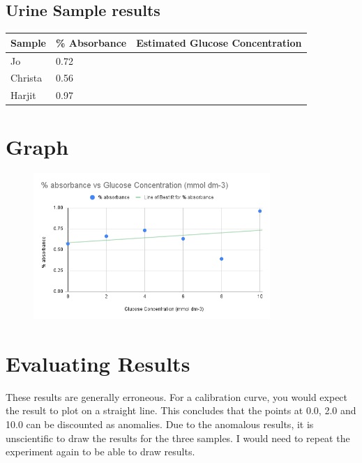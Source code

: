 \documentclass{thomasClass}
\begin{document}
\subsection{Urine Sample results}
\begin{table}[H]
\begin{tabularx}{0.6\textwidth}{lll}
Sample & \% Absorbance & Estimated Glucose Concentration \\
\hline
Jo & 0.72 &  \\
Christa & 0.56 &  \\
Harjit & 0.97 & 
\end{tabularx}
\end{table}

\section{Graph}
\begin{figure}[H]
    \centering
    \includegraphics[width=0.8\textwidth]{RPA11-GRAPH.png}

\end{figure}

\section{Evaluating Results}
These results are generally erroneous. For a calibration curve, you would expect the result to plot on a straight line. This concludes that the points at 0.0, 2.0 and 10.0 can be discounted as anomalies.
Due to the anomalous results, it is unscientific to draw the results for the three samples. I would need to repeat the experiment again to be able to draw results.
\end{document}
